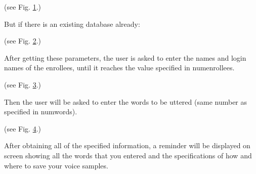     \begin{figure}[h]
    \begin{center}
     \caption{\label{trainpar_fig}}
    \end{center}
    \end{figure}

    (see Fig. \ref{trainpar_fig}.)

    But if there is an existing database already:

    \begin{figure}[h]
    \begin{center}
     \caption{\label{trainpar_exist_fig}}
    \end{center}
    \end{figure}

    (see Fig. \ref{trainpar_exist_fig}.)

      After getting these parameters, the user is asked to enter the
    names and login names of the enrollees, until it reaches the value
    specified in numenrollees.

    \begin{figure}[h]
    \begin{center}
     \caption{\label{name_fig}}
    \end{center}
    \end{figure}

    (see Fig. \ref{name_fig}.)

    Then the user will be asked to enter the
    words to be uttered (same number as specified in numwords).

    \begin{figure}[h]
    \begin{center}
     \caption{\label{word_fig}}
    \end{center}
    \end{figure}

    (see Fig. \ref{word_fig}.)

    After obtaining all of the specified information, a reminder
    will be displayed on screen showing all the words that you
    entered and the specifications of how and where to save your
    voice samples.

    \begin{figure}[h]
    \begin{center}
     \caption{\label{noteword_fig}}
    \end{center}
    \end{figure}

